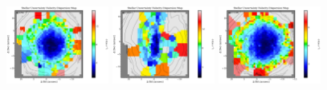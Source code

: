 \begin{figure}
      \\
      \includegraphics[width=0.3\textwidth]{chapter4/Vmaps/ic4296_stellar_sigma_uncert.png}
      \includegraphics[width=0.3\textwidth]{chapter4/Vmaps/ngc0612_stellar_sigma_uncert.png}
      \includegraphics[width=0.3\textwidth]{chapter4/Vmaps/ngc1399_stellar_sigma_uncert.png}
      \\
\end{figure}

